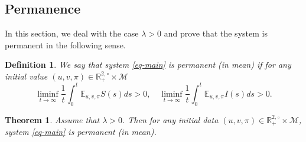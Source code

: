 \documentclass[12pt]{amsart}
\newtheorem{thm}{Theorem}[section]
\newtheorem{deff}{Definition}[section]
\theoremstyle{remark}
\numberwithin{equation}{section}
\newcommand{\M}{\mathcal{M}}
\newcommand{\E}{\mathbb{E}}
\newcommand{\R}{\mathbb{R}}
\numberwithin{equation}{section}
\newcommand{\wdt}{\widetilde}
\newcommand{\1}{\boldsymbol{1}}
\begin{document}
\subsection {Permanence}\label{secper}
In this section, we deal with  the case $\lambda>0$ and prove that the system is permanent in the following sense.
\begin{deff}
	We say that system \eqref{eq-main} is permanent (in mean) if for any initial value $(u,v,\pi)\in\R_+^{2,\circ}\times\M$
	$$
	\liminf_{t\to\infty}\frac 1t\int_0^t \E_{u,v,\pi}S(s)ds>0,\quad \liminf_{t\to\infty}\frac 1t\int_0^t \E_{u,v,\pi}I(s)ds>0.
	$$
\end{deff}


\begin{thm}\label{R>1}
Assume that $\lambda>0$. Then for any initial
data
$(u,v,\pi)\in \mathbb{R}_+^{2,\circ}\times\M$,  system \eqref{eq-main} is permanent (in mean).

\end{thm}
\end{document}

